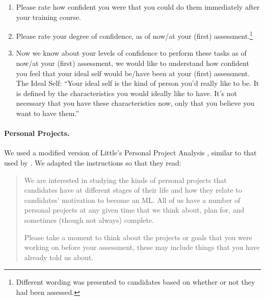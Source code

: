 \documentclass[
  12pt,
  a4paper,
]{book}
\providecommand{\tightlist}{%
  \setlength{\itemsep}{0pt}\setlength{\parskip}{0pt}}
\begin{document}
\begin{enumerate}
\def\labelenumi{\arabic{enumi})}
\tightlist
\item
  Please rate how confident you were that you could do them immediately after your training course.
\item
  Please rate your degree of confidence, as of now/at your (first) assessment.\footnote{Different wording was presented to candidates based on whether or not they had been assessed.}
\item
  Now we know about your levels of confidence to perform these tasks as of now/at your (first) assessment, we would like to understand how confident you feel that your ideal self would be/have been at your (first) assessment. The Ideal Self: ``Your ideal self is the kind of person you'd really like to be. It is defined by the characteristics you would ideally like to have. It's not necessary that you have these characteristics now, only that you believe you want to have them.''
\end{enumerate}

\hypertarget{personal-projects.}{%
\paragraph{Personal Projects.}\label{personal-projects.}}

We used a modified version of Little's Personal Project Analysis \citep[PPA;][]{Little1983}, similar to that used by \citet{Beattie2015}. We adapted the instructions so that they read:

\begin{quote}
We are interested in studying the kinds of personal projects that candidates have at different stages of their life and how they relate to candidates' motivation to become an ML. All of us have a number of personal projects at any given time that we think about, plan for, and sometimes (though not always) complete.

Please take a moment to think about the projects or goals that you were working on before your assessment, these may include things that you have already told us about.
\end{quote}
\end{document}
